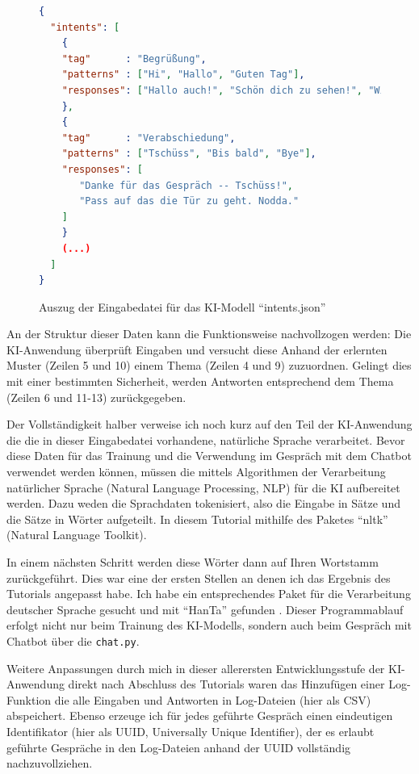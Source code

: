 \documentclass[12pt,oneside,titlepage,listof=totoc,bibliography=totoc]{scrartcl}
\newcommand{\code}[1]{\colorbox{code-gray}{\texttt{#1}}}
\begin{document}
\begin{figure}[H] \caption{Auszug der Eingabedatei für das KI-Modell \enquote{intents.json}}
\label{fig:code-intents.json} \begin{lstlisting}[language=json]
{
  "intents": [
    {
    "tag"      : "Begrüßung",
    "patterns" : ["Hi", "Hallo", "Guten Tag"],
    "responses": ["Hallo auch!", "Schön dich zu sehen!", "Willkommen!"]
    },
    {
    "tag"      : "Verabschiedung",
    "patterns" : ["Tschüss", "Bis bald", "Bye"],
    "responses": [
       "Danke für das Gespräch -- Tschüss!",
       "Pass auf das die Tür zu geht. Nodda."
    ]
    }
    (...)
  ]
}
\end{lstlisting} \end{figure}

An der Struktur dieser Daten kann die Funktionsweise nachvollzogen werden: Die KI-Anwendung überprüft Eingaben und versucht diese Anhand der erlernten Muster (Zeilen 5 und 10) einem Thema (Zeilen 4 und 9) zuzuordnen. Gelingt dies mit einer bestimmten Sicherheit, werden Antworten entsprechend dem Thema (Zeilen 6 und 11-13) zurückgegeben.

Der Vollständigkeit halber verweise ich noch kurz auf den Teil der KI-Anwendung die die in dieser Eingabedatei vorhandene, natürliche Sprache verarbeitet. Bevor diese Daten für das Trainung und die Verwendung im Gespräch mit dem Chatbot verwendet werden können, müssen die mittels Algorithmen der Verarbeitung natürlicher Sprache (Natural Language Processing, NLP) für die KI aufbereitet werden. Dazu weden die Sprachdaten tokenisiert, also die Eingabe in Sätze und die Sätze in Wörter aufgeteilt. In diesem Tutorial mithilfe des Paketes \enquote{nltk} (Natural Language Toolkit).

In einem nächsten Schritt werden diese Wörter dann auf Ihren Wortstamm zurückgeführt. Dies war eine der ersten Stellen an denen ich das Ergebnis des Tutorials angepasst habe. Ich habe ein entsprechendes Paket für die Verarbeitung deutscher Sprache gesucht und mit \enquote{HanTa} gefunden \parencite[]{57-wartena2019probabilistic}. Dieser Programmablauf erfolgt nicht nur beim Trainung des KI-Modells, sondern auch beim Gespräch mit Chatbot über die \code{chat.py}.

Weitere Anpassungen durch mich in dieser allerersten Entwicklungsstufe der KI-Anwendung direkt nach Abschluss des Tutorials waren das Hinzufügen einer Log-Funktion die alle Eingaben und Antworten in Log-Dateien (hier als CSV) abspeichert. Ebenso erzeuge ich für jedes geführte Gespräch einen eindeutigen Identifikator (hier als UUID, Universally Unique Identifier), der es erlaubt geführte Gespräche in den Log-Dateien anhand der UUID vollständig nachzuvollziehen. 
\end{document}
